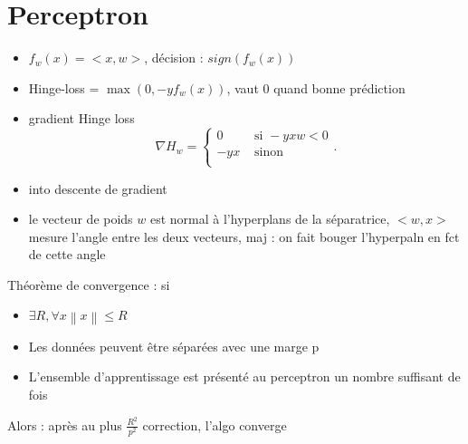 \documentclass{article}
\theoremstyle{plain}%
\theoremstyle{definition}
\theoremstyle{remark}
\begin{document}
\section{Perceptron}
\begin{itemize}
    \item $ f_w(x) = <x, w> $, décision : $ sign(f_w(x)) $  
    \item Hinge-loss = $ \max (0, -y f_w(x)) $, vaut 0 quand bonne prédiction
    \item gradient Hinge loss 
    \[
        \nabla H_w = \begin{cases}
        0 &\text{ si } -y x w < 0\\
        -yx &\text{ sinon}\\
        \end{cases} 
    .\]
    \item into descente de gradient
    \item le vecteur de poids $ w $ est normal à l'hyperplans de la séparatrice, $ <w, x> $ mesure l'angle entre les deux vecteurs, maj : on fait bouger l'hyperpaln en fct de cette angle 
\end{itemize}
Théorème de convergence : si
\begin{itemize}
    \item $ \exists R, \forall x \left\| x \right\| \leq R $ 
    \item Les données peuvent être séparées avec une marge p
    \item L'ensemble d'apprentissage est présenté au perceptron un nombre suffisant
    de fois
\end{itemize}
Alors : après au plus $ \frac{R^2}{p^2} $ correction, l'algo converge
\end{document}
